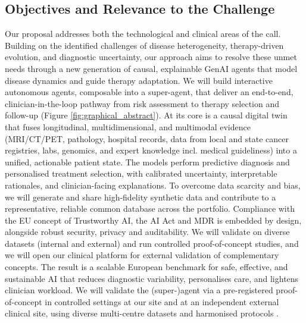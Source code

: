 \documentclass[11pt, a4paper]{article}
\begin{document}
\subsection{Objectives and Relevance to the Challenge}
Our proposal addresses both the technological and clinical areas of the call. Building on the identified challenges of disease heterogeneity, therapy-driven evolution, and diagnostic uncertainty, our approach aims to resolve these unmet needs through a new generation of causal, explainable GenAI agents that model disease dynamics and guide therapy adaptation. We will build interactive autonomous agents, composable into a super-agent, that deliver an end-to-end, clinician-in-the-loop pathway from risk assessment to therapy selection and follow-up (Figure \ref{fig:graphical_abstract}).  At its core is a causal digital twin that fuses longitudinal, multidimensional, and multimodal evidence (MRI/CT/PET, pathology, hospital records, data from local and state cancer registries, labs, genomics, and expert knowledge incl. medical guideliness) into a unified, actionable patient state. The models perform predictive diagnosis and personalised treatment selection, with calibrated uncertainty, interpretable rationales, and clinician-facing explanations. To overcome data scarcity and bias, we will generate and share high-fidelity synthetic data and contribute to a representative, reliable common database across the portfolio. Compliance with the EU concept of Trustworthy AI, the AI Act and MDR is embedded by design, alongside robust security, privacy and auditability. We will validate on diverse datasets (internal and external) and run controlled proof-of-concept studies, and we will open our clinical platform for external validation of complementary concepts. The result is a scalable European benchmark for safe, effective, and sustainable AI that reduces diagnostic variability, personalises care, and lightens clinician workload. 
We will validate the (super-)agent via a pre-registered proof-of-concept in controlled settings at our site and at an independent external clinical site, using diverse multi-centre datasets and harmonised protocols .   
 
\end{document}
